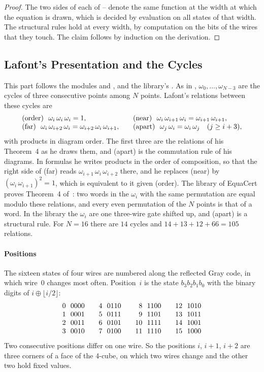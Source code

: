 \documentclass[acmsmall,screen,nonacm]{acmart}
\begin{document}
\begin{proof}
The two sides of each of -- denote the same function at the width at which the equation is drawn, which is decided by evaluation on all states of that width. The structural rules hold at every width, by computation on the bits of the wires that they touch. The claim follows by induction on the derivation.
\end{proof}

\subsection{Lafont's Presentation and the Cycles}\label{app:xcxccx-cycles}

This part follows the modules  and , and the library's . As in , $\omega_0,\dots,\omega_{N-3}$ are the cycles of three consecutive points among $N$ points. Lafont's relations between these cycles are
\[
\begin{array}{@{}l@{\qquad}l@{}}
\textup{(order)}\ \ \omega_i\,\omega_i\,\omega_i=1, & \textup{(near)}\ \ \omega_i\,\omega_{i+1}\,\omega_i=\omega_{i+1}\,\omega_{i+1},\\
\textup{(far)}\ \ \omega_i\,\omega_{i+2}\,\omega_i=\omega_{i+2}\,\omega_i\,\omega_{i+1}, & \textup{(apart)}\ \ \omega_j\,\omega_i=\omega_i\,\omega_j\quad(j\ge i+3),
\end{array}
\]
with products in diagram order. The first three are the relations of his Theorem~4 as he draws them, and (apart) is the commutation rule of his diagrams. In formulas he writes products in the order of composition, so that the right side of (far) reads $\omega_{i+1}\,\omega_i\,\omega_{i+2}$ there, and he replaces (near) by $(\omega_i\,\omega_{i+1})^2=1$, which is equivalent to it given (order). The library of EquaCert proves Theorem~4 of~\cite{lafont2003boolean}: two words in the $\omega_i$ with the same permutation are equal modulo these relations, and every even permutation of the $N$ points is that of a word. In the library the $\omega_i$ are one three-wire gate shifted up, and (apart) is a structural rule. For $N=16$ there are $14$ cycles and $14+13+12+66=105$ relations.

\paragraph{Positions} The sixteen states of four wires are numbered along the reflected Gray code, in which wire~0 changes most often. Position~$i$ is the state $b_3b_2b_1b_0$ with the binary digits of $i\oplus\lfloor i/2\rfloor$:
\[
\begin{array}{@{}r@{\ \ }l@{\qquad}r@{\ \ }l@{\qquad}r@{\ \ }l@{\qquad}r@{\ \ }l@{}}
0&0000 & 4&0110 & 8&1100 & 12&1010\\
1&0001 & 5&0111 & 9&1101 & 13&1011\\
2&0011 & 6&0101 & 10&1111 & 14&1001\\
3&0010 & 7&0100 & 11&1110 & 15&1000
\end{array}
\]
Two consecutive positions differ on one wire. So the positions $i$, $i+1$, $i+2$ are three corners of a face of the 4-cube, on which two wires change and the other two hold fixed values.
\end{document}
